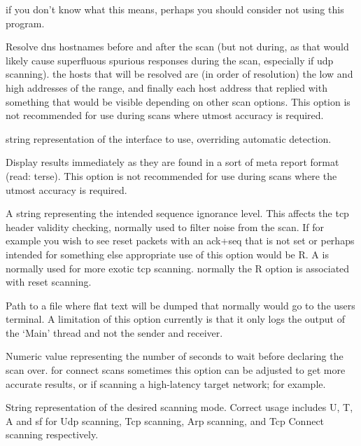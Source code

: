 \documentclass[english]{article}
\begin{document}
\begin{Description}
\item[   \oOpt{-h, --help            }]
if you don't know what this means, perhaps you should consider not using this program.
\item[   \oOpt{-H, --do-dns          }]
Resolve dns hostnames before and after the scan (but not during, as that would likely cause superfluous spurious
responses during the scan, especially if udp scanning). the hosts that will be resolved are (in order of resolution)
the low and high addresses of the range, and finally each host address that replied with something that would be
visible depending on other scan options. This option is not recommended for use during scans where utmost accuracy
is required.
\item[\oOptArg{-i, --interface       }{Interface}]
string representation of the interface to use, overriding automatic detection.
\item[   \oOpt{-I, --immediate       }]
Display results immediately as they are found in a sort of meta report format (read: terse). This option is not
recommended for use during scans where the utmost accuracy is required.
\item[\oOptArg{-j, --ignore-seq      }{Type}]
A string representing the intended sequence ignorance level. This affects the tcp header validity checking, normally
used to filter noise from the scan. If for example you wish to see reset packets with an ack+seq that is not set
or perhaps intended for something else appropriate use of this option would be R. A is normally used for more exotic
tcp scanning. normally the R option is associated with reset scanning.
\item[\oOptArg{-l, --logfile         }{File}]
Path to a file where flat text will be dumped that normally would go to the users terminal. A limitation of this option
currently is that it only logs the output of the `Main' thread and not the sender and receiver.
\item[\oOptArg{-L, --packet-timeout  }{Seconds}]
Numeric value representing the number of seconds to wait before declaring the scan over. for connect scans sometimes
this option can be adjusted to get more accurate results, or if scanning a high-latency target network; for example.
\item[\oOptArg{-m, --mode            }{Mode}]
String representation of the desired scanning mode. Correct usage includes U, T, A and sf for Udp scanning, Tcp scanning, Arp scanning, and Tcp Connect scanning respectively.
\item[\oOptArg{-M, --module-dir      }{Directory}]

\end{Description}
\end{document}
